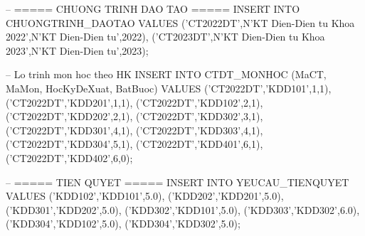 \documentclass[13pt, a4paper]{article}
\begin{document}
\begin{sqlbox}
-- ===== CHUONG TRINH DAO TAO =====
INSERT INTO CHUONGTRINH_DAOTAO VALUES
('CT2022DT',N'KT Dien-Dien tu Khoa 2022',N'KT Dien-Dien tu',2022),
('CT2023DT',N'KT Dien-Dien tu Khoa 2023',N'KT Dien-Dien tu',2023);

-- Lo trinh mon hoc theo HK
INSERT INTO CTDT_MONHOC (MaCT, MaMon, HocKyDeXuat, BatBuoc) VALUES
('CT2022DT','KDD101',1,1), ('CT2022DT','KDD201',1,1),
('CT2022DT','KDD102',2,1), ('CT2022DT','KDD202',2,1),
('CT2022DT','KDD302',3,1), ('CT2022DT','KDD301',4,1),
('CT2022DT','KDD303',4,1), ('CT2022DT','KDD304',5,1),
('CT2022DT','KDD401',6,1), ('CT2022DT','KDD402',6,0);

-- ===== TIEN QUYET =====
INSERT INTO YEUCAU_TIENQUYET VALUES
('KDD102','KDD101',5.0), ('KDD202','KDD201',5.0),
('KDD301','KDD202',5.0), ('KDD302','KDD101',5.0),
('KDD303','KDD302',6.0), ('KDD304','KDD102',5.0), ('KDD304','KDD302',5.0);
\end{sqlbox}
\end{document}

